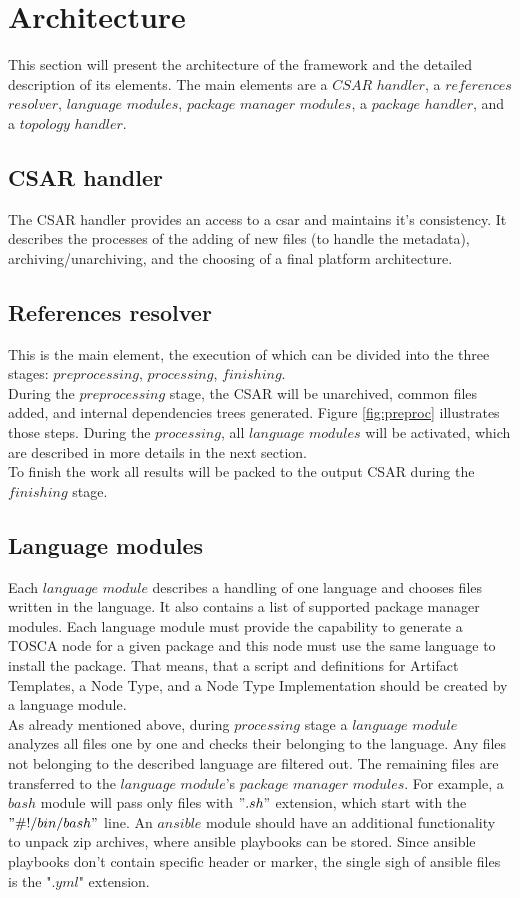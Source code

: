 \section{Architecture}\label{sec:arch}
This section will present the architecture of the framework and the detailed description of its elements.
The main elements are a $CSAR$ $handler$, a $references$ $resolver$, $language$ $modules$, $package$ $manager$ $modules$, a $package$ $handler$, and a $topology$ $handler$.

\subsection{CSAR handler} \label{subs:casr_h}
The CSAR handler provides an access to a \gls{csar} and maintains it's consistency. 
It describes the processes of the adding of new files (to handle the metadata), archiving/unarchiving, and the choosing of a final platform architecture.

\subsection{References resolver} \label{subs:RR}
This is the main element, the execution of which can be divided into the three stages: $preprocessing$, $processing$, $finishing$. \\
During the $preprocessing$ stage, the CSAR will be unarchived, common files added, and internal dependencies trees generated.
Figure \ref{fig:preproc} illustrates those steps.
During the $processing$, all $language$ $modules$ will be activated, which are described in more details in the next section. \\
To finish the work all results will be packed to the output CSAR during the $finishing$ stage.


\subsection{Language modules} \label{subs:archlm}
Each $language$ $module$ describes a handling of one language and chooses files written in the language.
It also contains a list of supported package manager modules.
Each language module must provide the capability to generate a TOSCA node for a given package and this node must use the same language to install the package.
That means, that a script and definitions for Artifact Templates, a Node Type, and a Node Type Implementation should be created by a language module.\\
As already mentioned above, during $processing$ stage a $language$ $module$ analyzes all files one by one and checks their belonging to the language. 
Any files not belonging to the described language are filtered out.
The remaining files are transferred to the $language$ $module$'s $package$ $manager$ $modules$.
For example, a $bash$ module will pass only files with $".sh"$ extension, which start with the $"\#!/bin/bash"$ line.
An $ansible$ module should have an additional functionality to unpack zip archives, where ansible playbooks can be stored.
Since ansible playbooks don't contain specific header or marker, the single sigh of ansible files is the "$.yml$" extension. 

